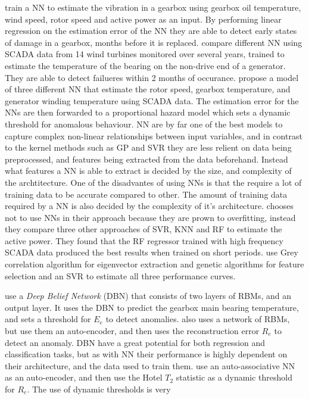 \textcite{ANN_damage_detection_gearbox_wt} train a NN to estimate the vibration in a gearbox using gearbox oil temperature, wind speed, rotor speed and active power as an input. By performing linear regression on the estimation error of the NN they are able to detect early states of damage in a gearbox, months before it is replaced. \textcite{detecting_malfunctions_wt_generator_bearings_generic_vs_specific_models} compare different NN using SCADA data from 14 wind turbines monitored over several years, trained to estimate the temperature of the bearing on the non-drive end of a generator. They are able to detect failueres within 2 months of occurance. \textcite{health_cond_model_nn_proportional_hazard_models} propose a model of three different NN that estimate the rotor speed, gearbox temperature, and generator winding temperature using SCADA data. The estimation error for the NNs are then forwarded to a proportional hazard model which sets a dynamic threshold for anomalous behaviour. NN are by far one of the best models to capture complex non-linear relationships between input variables, and in contrast to the kernel methods such as GP and SVR they are less relient on data being preprocessed, and features being extracted from the data beforehand. Instead what features a NN is able to extract is decided by the size, and complexity of the archtitecture. One of the disadvantes of using NNs is that the require a lot of training data to be accurate compared to other. The amount of training data required by a NN is also decided by the complexity of it's architecture. \textcite{high_freq_scada_perf_monit_sensitivity} chooses not to use NNs in their approach because they are prown to overfitting, instead they compare three other approaches of SVR, KNN and RF to estimate the active power. They found that the RF regressor trained with high frequency SCADA data produced the best results when trained on short periods. \textcite{abnormal_detection_scada_data_mining} use Grey correlation algorithm for eigenvector extraction and genetic algorithms for feature selection and an SVR to estimate all three performance curves. \bigskip

\textcite{DBN_chicken_swarm_optim} use a \textit{Deep Belief Network} (DBN) that consists of two layers of RBMs, and an output layer. It uses the DBN to predict the gearbox main bearing temperature, and sets a threshold for $E_e$ to detect anomalies. \textcite{AD_and_fault_analysis_wt_DAE} also uses a network of RBMs, but use them an auto-encoder, and then uses the reconstruction error $R_e$ to detect an anomaly. DBN have a great potential for both regression and classification tasks, but as with NN their performance is highly dependent on their architecture, and the data used to train them. \textcite{auto_associative_nn_wt_fault_detection} use an auto-associative NN as an auto-encoder, and then use the Hotel $T_2$ statistic as a dynamic threshold for $R_e$. The use of dynamic thresholds is very 

